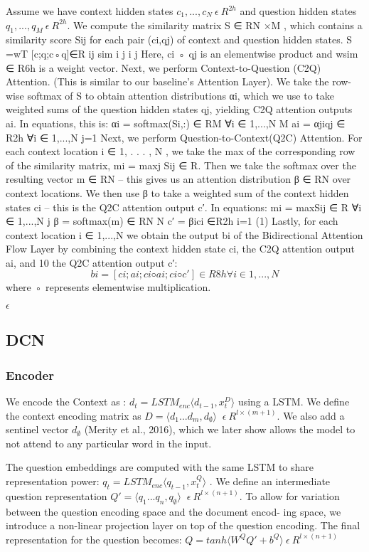 \documentclass{article} %
\begin{document}
Assume we have context hidden states $c_1, . . . , c_N \ \epsilon \  R^{2h} $ and question hidden states $q_1, . . . , q_M \ \epsilon \  R^{2h} $. We compute the similarity matrix S ∈ RN ×M , which contains a similarity score Sij for each pair (ci,qj) of context and question hidden states.
S =wT [c;q;c◦q]∈R ij sim i j i j
Here, ci ◦ qj is an elementwise product and wsim ∈ R6h is a weight vector.
Next, we perform Context-to-Question (C2Q) Attention. (This is similar to our baseline’s Attention Layer). We take the row-wise softmax of S to obtain attention distributions αi, which we use to take weighted sums of the question hidden states qj, yielding C2Q attention outputs ai.
In equations, this is:
αi = softmax(Si,:) ∈ RM ∀i ∈ {1,...,N} M
ai =  αjiqj ∈ R2h ∀i ∈ {1,...,N} j=1
Next, we perform Question-to-Context(Q2C) Attention. For each context location i ∈ {1, . . . , N }, we take the max of the corresponding row of the similarity matrix, mi = maxj Sij ∈ R. Then we take the softmax over the resulting vector m ∈ RN – this gives us an attention distribution β ∈ RN over context locations. We then use β to take a weighted sum of the context hidden states ci – this is the Q2C attention output c′. In equations:
mi = maxSij ∈ R ∀i ∈ {1,...,N} j
β = softmax(m) ∈ RN N
c′ = βici ∈R2h i=1
(1)
Lastly, for each context location i ∈ {1,...,N} we obtain the output bi of the Bidirectional Attention Flow Layer by combining the context hidden state ci, the C2Q attention output ai, and
10
the Q2C attention output c′:
$$bi =[ci;ai;ci ◦ai;ci ◦c′]∈R8h ∀i∈{1,...,N}$$
where ◦ represents elementwise multiplication.


\begin{math}\epsilon\end{math}
\subsection{DCN}

\subsubsection{Encoder}
We encode the Context as : $d_{t} = LSTM_{enc} \langle d_{t-1},x^{D}_{t} \rangle $ using a LSTM. 
We define the context encoding matrix as $ D = \langle d_{1} ...d_{m},d_{\emptyset} \rangle $ $ \ \epsilon \  R^{l\times(m+1)} $.
We also add a sentinel vector $ d_{\emptyset} $ (Merity et al., 2016), which we later show allows the model to not attend to any particular word in the input.

The question embeddings are computed with the same LSTM to share representation power: $ q_{t} =LSTM_{enc} \langle q_{t-1} , x^{Q}_{t} \rangle $ .
We define an intermediate question representation $ Q′ = \langle q_{1} . . . q_{n},q_{\emptyset} \rangle $ $ \ \epsilon \  R^{l\times(n+1)} $.
To allow for variation between the question encoding space and the document encod- ing space, we introduce a non-linear projection layer on top of the question encoding. 
The final representation for the question becomes: $ Q = tanh \langle   W^Q Q′ + b^Q \rangle \  \epsilon \  R^{l\times(n+1)} $
\end{document}
